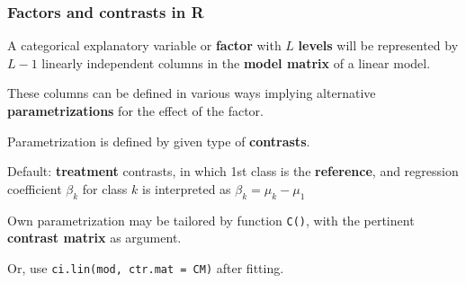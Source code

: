 \documentclass[12pt,dvipsnames,t,handout%
,aspectratio=169%
]{beamer}
\begin{document}
\begin{frame}
\frametitle{Factors and contrasts in R}

\bi
\item
A categorical explanatory variable or {\bf factor}  
with $L$ {\bf levels} will be represented by $L-1$ linearly independent
columns in the {\bf model matrix} of a linear model. 
\medskip
\item
These columns can be defined in various ways implying
alternative {\bf parametrizations} for the effect of the factor.
\medskip
\item 
Parametrization is defined by given type of {\bf contrasts}. 
\medskip
\item 
Default: {\bf treatment} contrasts, in which 1st class is the {\bf reference}, 
and regression coefficient $\beta_k$ for class $k$ is interpreted as $\beta_k = \mu_k - \mu_1$
\medskip
\item
Own parametrization may be tailored by
function {\tt C()}, with the pertinent 
{\bf contrast matrix} as argument.  
\medskip
\item
Or, use {\tt ci.lin(mod, ctr.mat = CM)} after fitting.
\ei
\end{frame}
\end{document}
